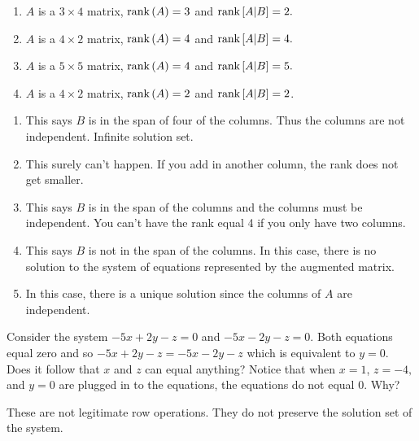 \begin{enumialphparenastyle}
\begin{ex}
\begin{enumerate}
  \item $A$ is a $3\times 4$ matrix, $\mbox{rank}\left(A\right) =3$ and 
    $\mbox{rank}\left[A|B\right] =2.$
    
  \item $A$ is a $4\times 2$ matrix, $\mbox{rank}\left(A\right) =4$ and 
    $\mbox{rank}\left[A|B \right] =4.$ 
    
  \item $A$ is a $5\times 5$ matrix, $\mbox{rank}\left(A\right) =4$ and 
    $\mbox{rank}\left[A|B \right] =5.$ 
    
  \item $A$ is a $4\times 2$ matrix, $\mbox{rank}\left(A\right) =2$ and 
    $\mbox{rank}\left[A|B \right] =2$.
  \end{enumerate}
  
  \begin{sol}
    \begin{enumerate}
    \item This says $B$ is in the span of four of the columns. Thus the columns are not independent. Infinite solution set.
    \item This surely can't happen. If you add in another column, the rank does not get smaller.
    \item This says $B$ is in the span of the columns and the columns must be
      independent. You can't have the rank equal 4 if you only have two columns.
    \item This says $B$ is not in the span of the columns. In this case, there is no solution to the system of equations represented by the augmented matrix.
    \item In this case, there is a
      unique solution since the columns of $A$ are independent.
    \end{enumerate}
  \end{sol}
\end{ex}

\begin{ex} Consider the system $-5x+2y-z=0$ and $-5x-2y-z=0.$ Both equations
equal zero and so $-5x+2y-z=-5x-2y-z$ which is equivalent to $y=0.$ Does it follow that $x$
and $z$ can equal anything?  Notice that when $x=1$, $z=-4,$ and $y=0$ are plugged in
to the equations, the equations do not equal $0$. Why?
\begin{sol}
These are not legitimate row
operations. They do not preserve the solution set of the system.
\end{sol}
\end{ex}

\end{enumialphparenastyle}
